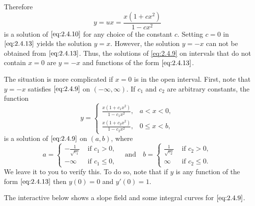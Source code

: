 \documentclass{ximera}
\begin{document}
\begin{example}
\begin{explanation}
  

Therefore
\begin{equation} \label{eq:2.4.13}
y=ux=\frac{x(1+cx^2)}{1-cx^2}
\end{equation}
is a solution of $\eqref{eq:2.4.10}$ for any choice of the constant $c$.
Setting $c=0$ in $\eqref{eq:2.4.13}$ yields the solution $y=x$. However, the
solution $y=-x$ can not be obtained from $\eqref{eq:2.4.13}$. Thus, the
solutions of \eqref{eq:2.4.9} on intervals that do not contain $x=0$ are
$y=-x$ and functions of the form $\eqref{eq:2.4.13}$.

The situation is more complicated if $x=0$ is in the open interval.
 First, note that $y=-x$ satisfies $\eqref{eq:2.4.9}$
on $(-\infty,\infty)$. If $c_1$ and $c_2$ are arbitrary constants,
 the function
\begin{equation} \label{eq:2.4.14}
y=\left\{\begin{array}{ll} \frac{x(1+c_1x^2)}{1-c_1x^2},&a<x<0,\\
\frac{x(1+c_2x^2)}{1-c_2x^2},&0\leq x<b,
 \end{array}\right.
\end{equation}
is a solution of $\eqref{eq:2.4.9}$ on $(a,b)$, where
$$
a=\left\{\begin{array}{cl}-\frac{1}{\sqrt{c_1}}&\text{ if }c_1>0,\\
-\infty&\text{ if }c_1\leq 0,
\end{array}\right. \quad\text{and}\quad
b=\left\{\begin{array}{cl}\frac{1}{\sqrt{c_2}}&\text{ if }c_2>0,\\
\infty&\text{ if }c_2\leq 0.
\end{array}\right.
$$
We leave it to you to verify this. To do so, note that if $y$ is
any function of the form $\eqref{eq:2.4.13}$ then $y(0)=0$ and $y'(0)=1$.


The interactive below shows a slope field and some integral curves
for $\eqref{eq:2.4.9}$.

\begin{center}
\end{center}


\end{explanation}
\end{example}
\end{document}
